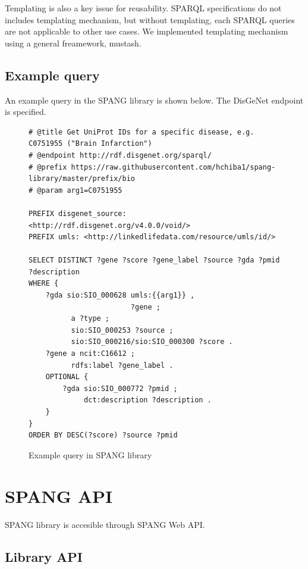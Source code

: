 \documentclass[runningheads]{llncs}
\begin{document}
Templating is also a key issue for reusability. SPARQL specifications do not includes templating mechanism, but without templating, each SPARQL queries are not applicable to other use cases. We implemented templating mechanism using a general freamework, mustash.




\subsection{Example query}
An example query in the SPANG library is shown below.
The DisGeNet endpoint is specified.

\begin{figure}[!t]
\begin{scriptsize}
\begin{verbatim}
# @title Get UniProt IDs for a specific disease, e.g. C0751955 ("Brain Infarction")
# @endpoint http://rdf.disgenet.org/sparql/
# @prefix https://raw.githubusercontent.com/hchiba1/spang-library/master/prefix/bio
# @param arg1=C0751955 

PREFIX disgenet_source: <http://rdf.disgenet.org/v4.0.0/void/>
PREFIX umls: <http://linkedlifedata.com/resource/umls/id/>

SELECT DISTINCT ?gene ?score ?gene_label ?source ?gda ?pmid ?description
WHERE {
    ?gda sio:SIO_000628 umls:{{arg1}} ,
                        ?gene ;
          a ?type ;
          sio:SIO_000253 ?source ;
          sio:SIO_000216/sio:SIO_000300 ?score .
    ?gene a ncit:C16612 ;
          rdfs:label ?gene_label .
    OPTIONAL {
        ?gda sio:SIO_000772 ?pmid ;
             dct:description ?description .
    }
}
ORDER BY DESC(?score) ?source ?pmid

\end{verbatim}
\end{scriptsize}
\caption{Example query in SPANG library}
\label{fig:example-rdf}
\end{figure}

\section{SPANG API}

SPANG library is accesible through SPANG Web API.

\subsection{Library API}
\end{document}
